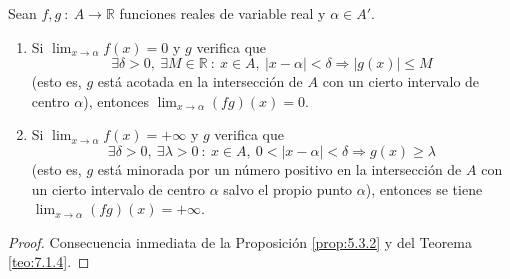 \begin{prop}\label{prop:13.6.2}
    Sean $f,g ~:~ A \longrightarrow \mathbb{R}$ funciones reales de variable real y $\alpha \in A'$.
    \begin{enumerate}
        \item Si $\displaystyle\lim_{x \to \alpha} f(x) = 0$ y $g$ verifica que
        \begin{equation*}
            \exists \delta > 0, ~ \exists M \in \mathbb{R} ~:~ x \in A, ~ |x-\alpha| < \delta \Longrightarrow |g(x)| \leq M
        \end{equation*}
        (esto es, $g$ está acotada en la intersección de $A$ con un cierto intervalo de centro $\alpha$),
        entonces $\displaystyle\lim_{x \to \alpha} (fg)(x) = 0$.

        \item Si $\displaystyle\lim_{x \to \alpha} f(x) = + \infty$ y $g$ verifica que
        \begin{equation*}
            \exists \delta > 0, ~ \exists \lambda > 0 ~:~ x \in A, ~ 0 < |x-\alpha| < \delta \Longrightarrow g(x) \geq \lambda
        \end{equation*}
        (esto es, $g$ está minorada por un número positivo en la intersección de $A$ con un cierto intervalo de centro $\alpha$ salvo el propio punto $\alpha$), entonces se tiene $\displaystyle\lim_{x \to \alpha} (fg)(x) =+\infty$.
    \end{enumerate}
\end{prop}
\begin{proof}
    Consecuencia inmediata de la Proposición \ref{prop:5.3.2} y del Teorema \ref{teo:7.1.4}. 
\end{proof}

